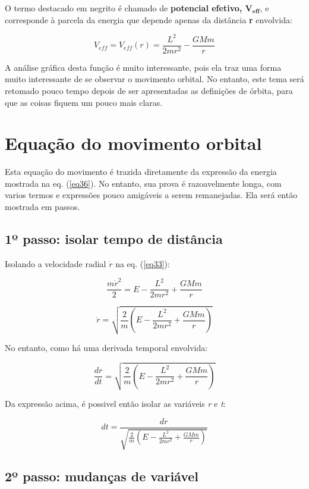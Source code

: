 O termo destacado em negrito é chamado de \textbf{potencial efetivo, $\mathbf{V_{eff}}$}, e corresponde à parcela da energia que depende apenas da distância \textbf{r} envolvida:

\begin{equation}
    V_{eff} = V_{eff}(r)  = \frac{L^2}{2mr^2} - \frac{GMm}{r} \label{eq37}
\end{equation}

A análise gráfica desta função é muito interessante, pois ela traz uma forma muito interessante de se observar o movimento orbital. No entanto, este tema será retomado pouco tempo depois de ser apresentadas as definições de órbita, para que as coisas fiquem um pouco mais claras.

\section{Equação do movimento orbital}

Esta equação do movimento é trazida diretamente da expressão da energia mostrada na eq. (\ref{eq36}). No entanto, sua prova é razoavelmente longa, com varios termos e expressões pouco amigáveis a serem remanejadas. Ela será então mostrada em passos.

\subsection{1º passo: isolar tempo de distância}

Isolando a velocidade radial $\dot{r}$ na eq. (\ref{eq33}):

\[
	\frac{m\dot{r}^2}{2} = E - \frac{L^2}{2mr^2} + \frac{GMm}{r}
\]

\[
	 \dot{r} = \sqrt{\frac{2}{m}\left(E - \frac{L^2}{2mr^2} + \frac{GMm}{r}\right)}
\]

No entanto, como há uma derivada temporal envolvida:

\[
	\frac{dr}{dt} = \sqrt{\frac{2}{m}\left(E - \frac{L^2}{2mr^2} + \frac{GMm}{r}\right)}
\]

Da expressão acima, é possivel então isolar as variáveis \textit{r} e \textit{t}:

\begin{equation}
	dt = \frac{dr}{\sqrt{\frac{2}{m}\left(E - \frac{L^2}{2mr^2} + \frac{GMm}{r}\right)}} \label{eq38}
\end{equation}

\subsection{2º passo: mudanças de variável}

